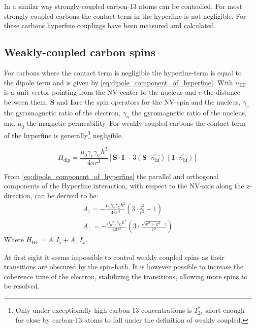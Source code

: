 In a similar way strongly-coupled carbon-13 atoms can be controlled\citep{Robledo2011HighFidelity}.
For most strongly-coupled carbons the contact term in the hyperfine is not negligible.
For these carbons hyperfine couplings have been measured\citep{Smeltzer201113} and calculated\citep{Gali2008Ab,Gali2009Identification}.

\subsection{Weakly-coupled carbon spins}
For carbons where the contact term is negligible the hyperfine-term is equal to the dipole term and is given by \cref{eq:dipole_component_of_hyperfine}\citep{Lange2012Quantum}.
With $n_\mathrm{HF}$ is a unit vector pointing from the NV-center to the nucleus and $r$ the distance between them.
$\mathbf{S}$ and $\mathbf{I}$are the spin operators for the NV-spin and the nucleus, $\gamma_e $ the gyromagnetic ratio of the electron, $\gamma_n$ the gyromagnetic ratio of the nucleus, and $\mu_0$ the magnetic permeability.
For weakly-coupled carbons the contact-term of the hyperfine is generally\footnote{Only under exceptionally high carbon-13 concentrations is $T_{2e}^*$ short enough for close by carbon-13 atoms to fall under the definition of weakly coupled. } negligible.

\begin{equation}
\label{eq:dipole_component_of_hyperfine}
H_{\mathrm{dip}} = \frac{\mu_0 \gamma_e \gamma_{\mathrm{C}} \hbar^2 }{4 \pi r^3} [ \bm{S \cdot I} - 3 (\bm S \cdot \hat{n_{\mathrm{hf}}})(\bm I \cdot \hat{n_{\mathrm{hf}}})]
\end{equation}

From \cref{eq:dipole_component_of_hyperfine}  the parallel and orthogonal components of the Hyperfine interaction, with respect to the NV-axis along the z-direction, can be derived to be:
 \begin{align}
A_\parallel= - \frac{\mu_0 \gamma_e \gamma_{\mathrm{C}} \hbar^2 }{4 \pi r^3} \left(3\cdot \frac{z^2}{r^2}-1\right)\\
 A_\perp =  -\frac{\mu_0 \gamma_e \gamma_{\mathrm{C}} \hbar^2 }{4 \pi r^3}\left( 3\cdot\frac{\sqrt{x^2+y^2}\cdot z}{r^2}\right)
\end{align}
Where $H_{\mathrm{HF}} = A_\parallel I_\mathrm{z} + A_\perp I_x $.

At first sight it seems impossible to control weakly coupled spins as their transitions are obscured by the spin-bath.
It is however possible to increase the coherence time of the electron, stabilizing the transitions, allowing more spins to be resolved.


